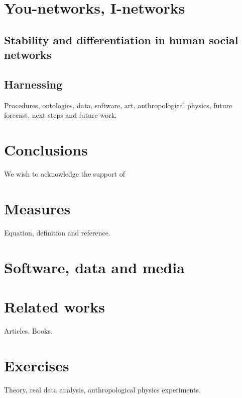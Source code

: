\documentclass[%
 aip,
 jmp,%
 amsmath,amssymb,
 reprint,%
]{revtex4-1}
\begin{document}
\section{\label{sec:inet}You-networks, I-networks}
\subsection{\label{sec:stabdiff}Stability and differentiation in human social networks}
\subsection{\label{sec:harn}Harnessing}
Procedures, ontologies, data, software, art, anthropological physics, 
future forecast, next steps and future work.

\section{\label{sec:conc}Conclusions}

\begin{acknowledgments}
We wish to acknowledge the support of 
\end{acknowledgments}

\appendix

\section{Measures}
Equation, definition and reference.

\section{Software, data and media}
\section{Related works}
Articles. Books.
\section{Exercises}
Theory, real data analysis, anthropological physics experiments.


\nocite{*}
\end{document}
